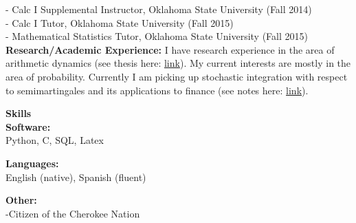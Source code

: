 \documentclass[12pt]{amsart}
\newcommand{\n}{\noindent}
\begin{document}
\n - Calc I Supplemental Instructor, Oklahoma State University (Fall 2014)\\
\n - Calc I Tutor, Oklahoma State University (Fall 2015)\\
\n - Mathematical Statistics Tutor, Oklahoma State University (Fall 2015)\\

\n \textbf{\large Research/Academic Experience:}
I have research experience in the area of arithmetic dynamics (see thesis here: \textcolor{blue}{ \href{https://github.com/carsonaj/Math/blob/master/Arithmetic\%20Dynamics/Arithmetic\%20Dynamics\%20Notes.pdf}{link}}). My current interests are mostly in the area of probability. Currently I am picking up stochastic integration with respect to semimartingales and its applications to finance (see notes here: \textcolor{blue}{ \href{https://github.com/carsonaj/Math/blob/master/Stochastic\%20Analysis/Stochastic\%20Processes\%20-\%20James.pdf}{link}}). \vspace{4mm}

 \n \textbf{\large Skills}\vspace{2mm}\\
\n \textbf{Software:}\\
Python, C, SQL, Latex\vspace{2mm}

\n \textbf{Languages:}\\
English (native), Spanish (fluent) \vspace{2mm}

\n \textbf{Other:}\\
-Citizen of the Cherokee Nation
\end{document}
